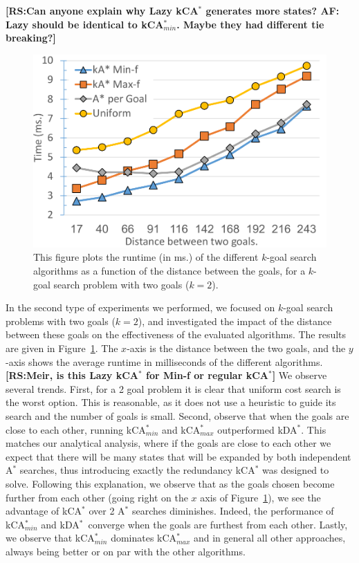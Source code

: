 \documentclass{aicom2e}
\newcommand{\kgs}{$k$-goal search}
\newcommand{\astar}{A$^*$}
\newcommand{\kastar}{kCA$^*$}
\newcommand{\kastarmin}{kCA$^*_{min}$}
\newcommand{\kastarmax}{kCA$^*_{max}$}
\newcommand{\kxastar}{kDA$^*$}
\newcommand{\minf}{Min-f}
\newcommand{\roni}[1]{\textbf{[RS:#1]}}
\begin{document}
\roni{Can anyone explain why Lazy \kastar{} generates more states? AF: Lazy
should be identical to \kastarmin{}. Maybe they had different tie breaking?}




\begin{figure}
    \includegraphics[width=\columnwidth]{G0-G1_cropped.pdf}
    \caption{This figure plots the runtime (in ms.) of the different \kgs{} algorithms as a function of the distance between the goals, for a \kgs{} problem with two goals ($k=2$).}
    \label{fig:2-goal}
\end{figure}

In the second type of experiments we performed, we focused on \kgs{} problems
with two goals ($k=2$), and investigated the impact of the distance between
these goals on the effectiveness of the evaluated algorithms. The results are
given in Figure~\ref{fig:2-goal}. The $x$-axis is the distance between the two
goals, and the $y$-axis shows the average runtime in milliseconds of the
different algorithms. \roni{Meir, is this Lazy \kastar{} for \minf{} or regular
\kastar{}} We observe several trends. First, for a 2 goal problem it is clear
that uniform cost search is the worst option. This is reasonable, as it does
not use a heuristic to guide its search and the number of goals is small.
Second, observe that when the goals are close to each other, running
\kastarmin{} and \kastarmax{} outperformed \kxastar. This matches our
analytical analysis, where if the goals are close to each other we expect that
there will be many states that will be expanded by both independent \astar{}
searches, thus introducing exactly the redundancy \kastar{} was designed to
solve. Following this explanation, we observe that as the goals chosen become
further from each other (going right on the $x$ axis of
Figure~\ref{fig:2-goal}), we see the advantage of \kastar{} over 2 \astar{}
searches diminishes. Indeed, the performance of \kastarmin{} and \kxastar\
converge when the goals are furthest from each other. Lastly, we observe that
\kastarmin{} dominates \kastarmax{} and in general all other approaches, always
being better or on par with the other algorithms.
\end{document}
